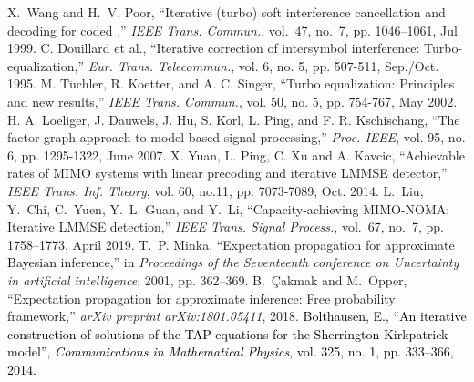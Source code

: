 \documentclass[journal]{IEEEtran}
\newcommand{\mr}{\mathrm}
\newcommand{\LL}[1]{\textcolor{black}{#1}}
\begin{document}
\begin{thebibliography}{1}
X.~Wang and H.~V. Poor, ``Iterative (turbo) soft interference cancellation and decoding for coded ,'' \textit{{IEEE} Trans. Commun.}, vol.~47, no.~7, pp. 1046--1061, Jul 1999.
 C. Douillard et al., ``Iterative correction of intersymbol interference: Turbo-equalization,'' \textit{Eur. Trans. Telecommun.}, vol. 6, no. 5, pp. 507-511, Sep./Oct. 1995.
M. T$\ddot{\mr{u}}$chler, R. Koetter, and A. C. Singer, ``Turbo equalization: Principles
and new results,'' \textit{IEEE Trans. Commun.}, vol. 50, no. 5, pp. 754-767, May 2002.
H. A. Loeliger, J. Dauwels, J. Hu, S. Korl, L. Ping, and F. R. Kschischang, ``The factor graph approach to model-based signal processing,'' \textit{Proc. IEEE}, vol. 95, no. 6, pp. 1295-1322, June 2007.
X. Yuan, L. Ping, C. Xu and A. Kavcic, ``Achievable rates of MIMO systems with linear precoding and iterative LMMSE detector,'' \textit{IEEE Trans. Inf. Theory}, vol. 60, no.11, pp. 7073-7089, Oct. 2014.
L.~{Liu}, Y.~{Chi}, C.~{Yuen}, Y.~L. {Guan}, and Y.~{Li}, ``Capacity-achieving
  {MIMO-NOMA}: Iterative LMMSE detection,'' \textit{IEEE Trans. Signal
  Process.}, vol.~67, no.~7, pp. 1758--1773, April 2019.
T.~P. Minka, ``Expectation propagation for approximate \LL{Bayesian} inference,'' in
  \textit{Proceedings of the Seventeenth conference on Uncertainty in artificial
  intelligence}, 2001, pp. 362--369.
B.~{\c{C}}akmak and M.~Opper, ``Expectation propagation for approximate
  inference: Free probability framework,'' \textit{arXiv preprint
  arXiv:1801.05411}, 2018.     
\LL{
  Bolthausen, E., ``An iterative construction of solutions of the TAP equations for the Sherrington-Kirkpatrick model'', \textit{Communications in Mathematical Physics}, vol. 325, no. 1, pp. 333–366, 2014.}

\end{thebibliography}
\end{document}
